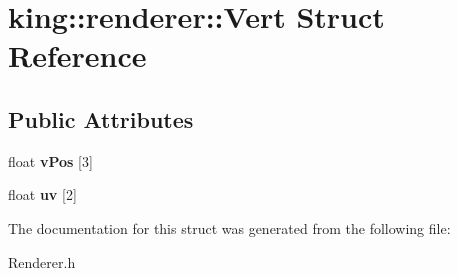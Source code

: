 \hypertarget{structking_1_1renderer_1_1_vert}{\section{king\-:\-:renderer\-:\-:Vert Struct Reference}
\label{structking_1_1renderer_1_1_vert}
}
\subsection*{Public Attributes}
\begin{DoxyCompactItemize}
\item 
\hypertarget{structking_1_1renderer_1_1_vert_a6bddfcdfce0fd66cdf83bab10cb022f8}{float {\bfseries v\-Pos} \mbox{[}3\mbox{]}}\label{structking_1_1renderer_1_1_vert_a6bddfcdfce0fd66cdf83bab10cb022f8}

\item 
\hypertarget{structking_1_1renderer_1_1_vert_a9c0263b6a4b1ab8038827f5568f83085}{float {\bfseries uv} \mbox{[}2\mbox{]}}\label{structking_1_1renderer_1_1_vert_a9c0263b6a4b1ab8038827f5568f83085}

\end{DoxyCompactItemize}


The documentation for this struct was generated from the following file\-:\begin{DoxyCompactItemize}
\item 
Renderer.\-h\end{DoxyCompactItemize}
